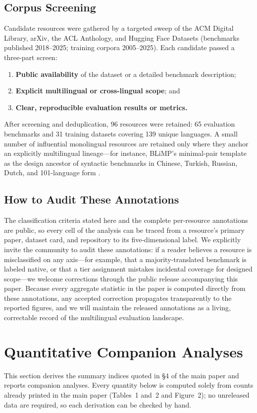 \documentclass[letterpaper]{article}
\begin{document}
\subsection{Corpus Screening}
Candidate resources were gathered by a targeted sweep of the ACM Digital Library, arXiv, the ACL Anthology, and Hugging Face Datasets (benchmarks published 2018--2025; training corpora 2005--2025). Each candidate passed a three-part screen:
\begin{enumerate}
\item \textbf{Public availability} of the dataset or a detailed benchmark description;
\item \textbf{Explicit multilingual or cross-lingual scope}; and
\item \textbf{Clear, reproducible evaluation results or metrics.}
\end{enumerate}
After screening and deduplication, 96 resources were retained: 65 evaluation benchmarks and 31 training datasets covering 139 unique languages. A small number of influential monolingual resources are retained only where they anchor an explicitly multilingual lineage---for instance, BLiMP's minimal-pair template as the design ancestor of syntactic benchmarks in Chinese, Turkish, Russian, Dutch, and 101-language form \cite{warstadt2020blimp}.

\subsection{How to Audit These Annotations}
The classification criteria stated here and the complete per-resource annotations are public, so every cell of the analysis can be traced from a resource's primary paper, dataset card, and repository to its five-dimensional label. We explicitly invite the community to audit these annotations: if a reader believes a resource is misclassified on any axis---for example, that a majority-translated benchmark is labeled native, or that a tier assignment mistakes incidental coverage for designed scope---we welcome corrections through the public release accompanying this paper. Because every aggregate statistic in the paper is computed directly from these annotations, any accepted correction propagates transparently to the reported figures, and we will maintain the released annotations as a living, correctable record of the multilingual evaluation landscape.

\section{Quantitative Companion Analyses}
\label{sec:quant}
This section derives the summary indices quoted in \S4 of the main paper and reports companion analyses. Every quantity below is computed solely from counts already printed in the main paper (Tables~1 and~2 and Figure~2); no unreleased data are required, so each derivation can be checked by hand.
\end{document}
